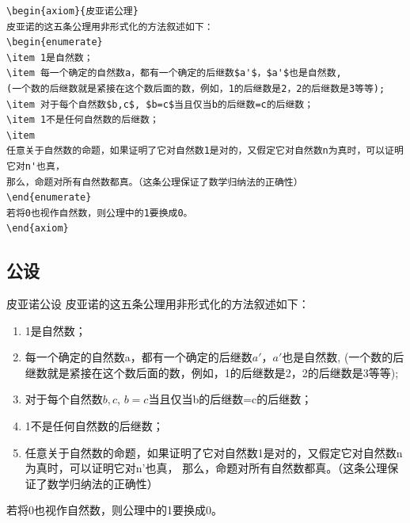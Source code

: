 \documentclass[../book.tex]{subfiles}
\begin{document}
\begin{lstlisting}
\begin{axiom}{皮亚诺公理}
皮亚诺的这五条公理用非形式化的方法叙述如下：
\begin{enumerate}
\item 1是自然数；
\item 每一个确定的自然数a，都有一个确定的后继数$a'$，$a'$也是自然数,
(一个数的后继数就是紧接在这个数后面的数，例如，1的后继数是2，2的后继数是3等等);
\item 对于每个自然数$b,c$, $b=c$当且仅当b的后继数=c的后继数；
\item 1不是任何自然数的后继数；
\item
任意关于自然数的命题，如果证明了它对自然数1是对的，又假定它对自然数n为真时，可以证明它对n'也真，
那么，命题对所有自然数都真。（这条公理保证了数学归纳法的正确性）
\end{enumerate}
若将0也视作自然数，则公理中的1要换成0。
\end{axiom}
\end{lstlisting}

    \subsection{公设}

\begin{postulate}{皮亚诺公设}
皮亚诺的这五条公理用非形式化的方法叙述如下：
\begin{enumerate}
\item 1是自然数；
\item 每一个确定的自然数a，都有一个确定的后继数$a'$，$a'$也是自然数,
(一个数的后继数就是紧接在这个数后面的数，例如，1的后继数是2，2的后继数是3等等);
\item 对于每个自然数$b,c$, $b=c$当且仅当b的后继数=c的后继数；
\item 1不是任何自然数的后继数；
\item
任意关于自然数的命题，如果证明了它对自然数1是对的，又假定它对自然数n为真时，可以证明它对n'也真，
那么，命题对所有自然数都真。（这条公理保证了数学归纳法的正确性）
\end{enumerate}
若将0也视作自然数，则公理中的1要换成0。
\end{postulate}
\end{document}
